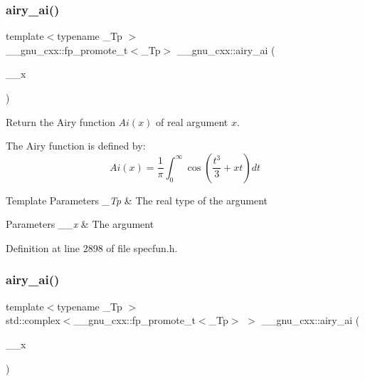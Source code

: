 \subsubsection{\texorpdfstring{airy\+\_\+ai()}{airy\_ai()}\hspace{0.1cm}{\footnotesize\ttfamily [1/2]}}
{\footnotesize\ttfamily template$<$typename \+\_\+\+Tp $>$ \\
\+\_\+\+\_\+gnu\+\_\+cxx\+::fp\+\_\+promote\+\_\+t$<$\+\_\+\+Tp$>$ \+\_\+\+\_\+gnu\+\_\+cxx\+::airy\+\_\+ai (\begin{DoxyParamCaption}\item[{\+\_\+\+Tp}]{\+\_\+\+\_\+x }\end{DoxyParamCaption})\hspace{0.3cm}{\ttfamily [inline]}}

Return the Airy function $ Ai(x) $ of real argument $ x $.

The Airy function is defined by\+: \[ Ai(x) = \frac{1}{\pi}\int_0^\infty \cos \left(\frac{t^3}{3} + xt \right)dt \]


\begin{DoxyTemplParams}{Template Parameters}
{\em \+\_\+\+Tp} & The real type of the argument \\
\hline
\end{DoxyTemplParams}

\begin{DoxyParams}{Parameters}
{\em \+\_\+\+\_\+x} & The argument \\
\hline
\end{DoxyParams}


Definition at line 2898 of file specfun.\+h.

\mbox{\label{group__gnu__math__spec__func_gacf37e6c9f186ade270b476c8e5826fb9}} 
\subsubsection{\texorpdfstring{airy\+\_\+ai()}{airy\_ai()}\hspace{0.1cm}{\footnotesize\ttfamily [2/2]}}
{\footnotesize\ttfamily template$<$typename \+\_\+\+Tp $>$ \\
std\+::complex$<$\+\_\+\+\_\+gnu\+\_\+cxx\+::fp\+\_\+promote\+\_\+t$<$\+\_\+\+Tp$>$ $>$ \+\_\+\+\_\+gnu\+\_\+cxx\+::airy\+\_\+ai (\begin{DoxyParamCaption}\item[{std\+::complex$<$ \+\_\+\+Tp $>$}]{\+\_\+\+\_\+x }\end{DoxyParamCaption})\hspace{0.3cm}{\ttfamily [inline]}}

